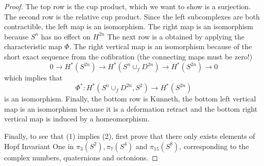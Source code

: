 \begin{proof}
  The top row is the cup product, which we want to show is a surjection.
  The second row is the relative cup product.  
  Since the left subcomplexes are both contractible, the left map is an isomorphism.
  The right map is an isomorphism because $S^n$ has no effect on $H^{2n}$
  The next row is a obtained by applying the characteristic map $\Phi$.  
  The right vertical map is an isomorphism because of the short exact sequence from the cofibration (the connecting maps must be zero!) 
  \[0\to H^*(S^{2n})\to H^*(S^{n}\cup_f D^{2n})\to H^*(S^{2n})\to 0 \]
  which implies that
  \[\Phi^*:H^*(S^{n}\cup_f D^{2n},S^{2})\to H^*(S^{2n})\]
  is an isomorphism.
  Finally, the bottom row is Kunneth, the bottom left vertical map is an isomorphism because it is a deformation retract and the bottom right vertical map is induced by a homeomorphism.  


Finally, to see that (1) implies (2), first prove that there only exists elements of Hopf Invariant One in $\pi_3(S^2),\pi_7(S^4)$ and $\pi_{15}(S^8)$, corresponding to the complex numbers, quaternions and octonions.  

\end{proof}


